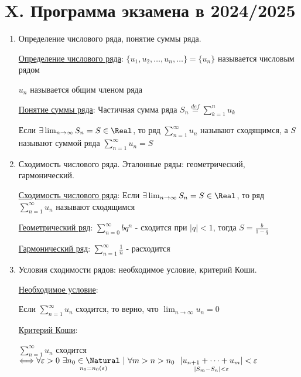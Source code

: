 \clearpage

\section{X. Программа экзамена в 2024/2025}


\begin{enumerate}
\subsection{X.1. Числовые ряды.}

    \item Определение числового ряда, понятие суммы ряда.

    \hyperlink{numberseriesdefinition}{Определение числового ряда}: $\{u_1, u_2, \dots, u_n, \dots\} = \{u_n\}$ называется числовым рядом

    $u_n$ называется общим членом ряда
    
    \hyperlink{sumofseriesdefinition}{Понятие суммы ряда}: Частичная сумма ряда $S_n \stackrel{def}{=} \sum_{k = 1}^{n} u_k$

    Если $\exists \lim_{n \to\infty} S_n = S \in \Real$, то ряд $\sum_{n = 1}^\infty u_n$ называют сходящимся,
    а $S$ называют суммой ряда $\sum_{n = 1}^\infty u_n = S$

    \item Сходимость числового ряда. Эталонные ряды: геометрический, гармонический.

    \hyperlink{seriesconvergence}{Сходимость числового ряда}: Если $\exists \lim_{n \to\infty} S_n = S \in \Real$, то ряд $\sum_{n = 1}^\infty u_n$ называют сходящимся

    \hyperlink{geometricseries}{Геометрический ряд}: $\sum_{n = 0}^\infty b q^n$ - сходится при $|q| < 1$, тогда $S = \frac{b}{1 - q}$
    
    \hyperlink{harmonicseries}{Гармонический ряд}: $\sum_{n = 1}^\infty \frac{1}{n}$ - расходится

    \item Условия сходимости рядов: необходимое условие, критерий Коши.

    \hyperlink{necessarycondition}{Необходимое условие}: 

    \Ths Если $\sum_{n = 1}^\infty u_n$ сходится, то верно, что $\lim_{n \to \infty} u_n = 0$

    \hyperlink{cauchycriteria}{Критерий Коши}:

    \Ths $\sum_{n = 1}^\infty u_n$ сходится $\Longleftrightarrow \forall \varepsilon > 0 \ \exists \underset{n_0 = n_0 (\varepsilon)}{n_0 \in \Natural} \ | \ \forall m > n > n_0 \ \ \underset{|S_m - S_n| < \varepsilon}{|u_{n + 1} + \dots + u_m|} < \varepsilon$


\end{enumerate}

